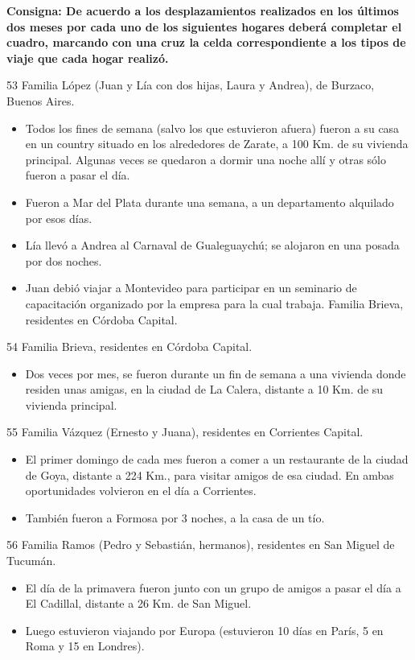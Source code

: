 \documentclass[
  openany]{book}
\providecommand{\tightlist}{%
  \setlength{\itemsep}{0pt}\setlength{\parskip}{0pt}}
\begin{document}
\textbf{Consigna: De acuerdo a los desplazamientos realizados en los últimos dos meses por cada uno de los siguientes hogares deberá completar el cuadro, marcando con una cruz la celda correspondiente a los tipos de viaje que cada hogar realizó.}

53 Familia López (Juan y Lía con dos hijas, Laura y Andrea), de Burzaco, Buenos Aires.

\begin{itemize}
\item
  Todos los fines de semana (salvo los que estuvieron afuera) fueron a su casa en un country situado en los alrededores de Zarate, a 100 Km. de su vivienda principal. Algunas veces se quedaron a dormir una noche allí y otras sólo fueron a pasar el día.
\item
  Fueron a Mar del Plata durante una semana, a un departamento alquilado por esos días.
\item
  Lía llevó a Andrea al Carnaval de Gualeguaychú; se alojaron en una posada por dos noches.
\item
  Juan debió viajar a Montevideo para participar en un seminario de capacitación organizado por la empresa para la cual trabaja. Familia Brieva, residentes en Córdoba Capital.
\end{itemize}

54 Familia Brieva, residentes en Córdoba Capital.

\begin{itemize}
\tightlist
\item
  Dos veces por mes, se fueron durante un fin de semana a una vivienda donde residen unas amigas, en la ciudad de La Calera, distante a 10 Km. de su vivienda principal.
\end{itemize}

55 Familia Vázquez (Ernesto y Juana), residentes en Corrientes Capital.

\begin{itemize}
\item
  El primer domingo de cada mes fueron a comer a un restaurante de la ciudad de Goya, distante a 224 Km., para visitar amigos de esa ciudad. En ambas oportunidades volvieron en el día a Corrientes.
\item
  También fueron a Formosa por 3 noches, a la casa de un tío.
\end{itemize}

56 Familia Ramos (Pedro y Sebastián, hermanos), residentes en San Miguel de Tucumán.

\begin{itemize}
\item
  El día de la primavera fueron junto con un grupo de amigos a pasar el día a El Cadillal, distante a 26 Km. de San Miguel.
\item
  Luego estuvieron viajando por Europa (estuvieron 10 días en París, 5 en Roma y 15 en Londres).
\end{itemize}
\end{document}
